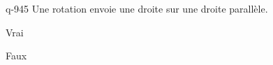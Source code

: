 \begin{truefalse}{q-945}
Une rotation envoie une droite sur une droite parallèle.
\item Vrai
\item* Faux
\end{truefalse}

